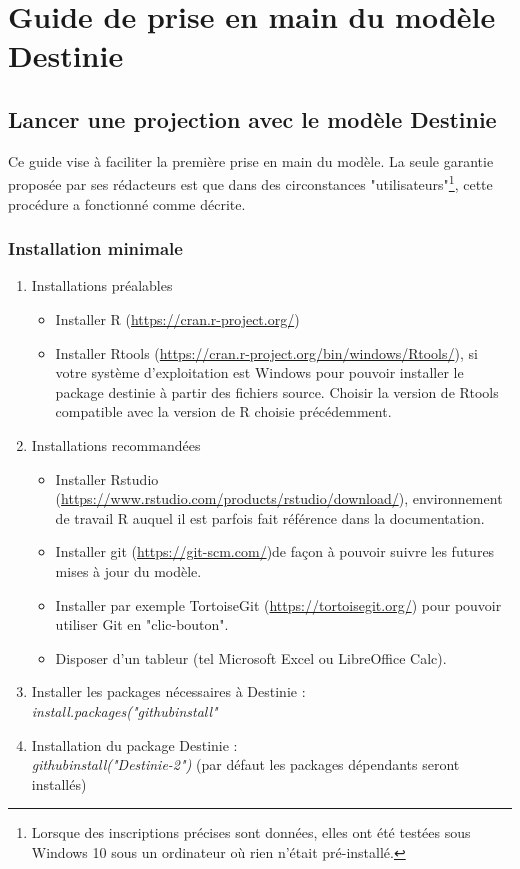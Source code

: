 \section{Guide de prise en main du modèle Destinie}
\subsection{Lancer une projection avec le modèle Destinie}
Ce guide vise à faciliter la première prise en main du modèle. La seule garantie proposée par ses rédacteurs est que dans des circonstances "utilisateurs"\footnote{Lorsque des inscriptions précises sont données, elles ont été testées sous Windows 10  sous un ordinateur où rien n'était pré-installé.}, cette procédure a fonctionné comme décrite.\\
\subsubsection{Installation minimale}
\begin{enumerate}

\item Installations préalables 
\begin{itemize}
\item Installer	R (\url{https://cran.r-project.org/}) 
\item Installer	Rtools (\url{https://cran.r-project.org/bin/windows/Rtools/}), si votre système d'exploitation est Windows pour pouvoir installer le package destinie à partir des fichiers source. Choisir la version de Rtools compatible avec la version de R choisie précédemment. 
\end{itemize}



\item Installations recommandées 
\begin{itemize}
\item Installer	Rstudio (\url{https://www.rstudio.com/products/rstudio/download/}), environnement de travail R auquel il est parfois fait référence dans la documentation.
\item Installer git (\url{https://git-scm.com/})de façon à pouvoir suivre les futures mises à jour du modèle.
\item Installer par exemple TortoiseGit (\url{https://tortoisegit.org/}) pour pouvoir utiliser Git en "clic-bouton".
\item Disposer d'un tableur (tel Microsoft Excel ou LibreOffice Calc).
\end{itemize}

\item Installer les packages nécessaires à Destinie :\\
\textit{install.packages("githubinstall"}
\item Installation du package Destinie :\\
\textit{githubinstall("Destinie-2")} (par défaut les packages dépendants seront installés)

\end{enumerate}

